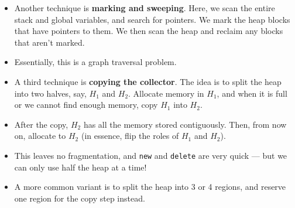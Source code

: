 \documentclass[12pt]{article}
\begin{document}
\begin{itemize}
    \item Another technique is \textbf{marking and sweeping}.  Here, we scan the entire stack and global variables, and search for pointers.  We mark the heap blocks that have pointers to them.  We then scan the heap and reclaim any blocks that aren't marked.  
    \item Essentially, this is a graph traversal problem.
    \item A third technique is \textbf{copying the collector}.  The idea is to split the heap into two halves, say, $H_1$ and $H_2$.  Allocate memory in $H_1$, and when it is full or we cannot find enough memory, copy $H_1$ into $H_2$.  
    \item After the copy, $H_2$ has all the memory stored contiguously.  Then, from now on, allocate to $H_2$ (in essence, flip the roles of $H_1$ and $H_2$).
    \item This leaves no fragmentation, and \lstinline[mathescape]{new} and \lstinline[mathescape]{delete} are very quick --- but we can only use half the heap at a time!
    \item A more common variant is to split the heap into 3 or 4 regions, and reserve one region for the copy step instead.
\end{itemize}
\end{document}
